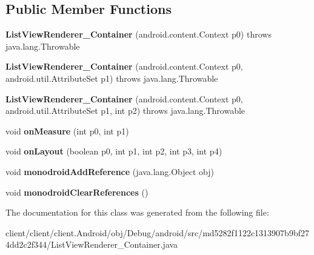 \subsection*{Public Member Functions}
\begin{DoxyCompactItemize}
\item 
\hypertarget{classmd5282f1122c1313907b9bf274dd2c2f344_1_1ListViewRenderer__Container_aec5487f4ed0e18a1cf69a340f616e8d2}{}{\bfseries List\+View\+Renderer\+\_\+\+Container} (android.\+content.\+Context p0)  throws java.\+lang.\+Throwable 	\label{classmd5282f1122c1313907b9bf274dd2c2f344_1_1ListViewRenderer__Container_aec5487f4ed0e18a1cf69a340f616e8d2}

\item 
\hypertarget{classmd5282f1122c1313907b9bf274dd2c2f344_1_1ListViewRenderer__Container_ac7349cc293b89991c55dec76ba9fb3fb}{}{\bfseries List\+View\+Renderer\+\_\+\+Container} (android.\+content.\+Context p0, android.\+util.\+Attribute\+Set p1)  throws java.\+lang.\+Throwable 	\label{classmd5282f1122c1313907b9bf274dd2c2f344_1_1ListViewRenderer__Container_ac7349cc293b89991c55dec76ba9fb3fb}

\item 
\hypertarget{classmd5282f1122c1313907b9bf274dd2c2f344_1_1ListViewRenderer__Container_a6d5abf1e4e150015c69510b2730ab722}{}{\bfseries List\+View\+Renderer\+\_\+\+Container} (android.\+content.\+Context p0, android.\+util.\+Attribute\+Set p1, int p2)  throws java.\+lang.\+Throwable 	\label{classmd5282f1122c1313907b9bf274dd2c2f344_1_1ListViewRenderer__Container_a6d5abf1e4e150015c69510b2730ab722}

\item 
\hypertarget{classmd5282f1122c1313907b9bf274dd2c2f344_1_1ListViewRenderer__Container_a419475e7d7c0dc39dc4751af4a23675f}{}void {\bfseries on\+Measure} (int p0, int p1)\label{classmd5282f1122c1313907b9bf274dd2c2f344_1_1ListViewRenderer__Container_a419475e7d7c0dc39dc4751af4a23675f}

\item 
\hypertarget{classmd5282f1122c1313907b9bf274dd2c2f344_1_1ListViewRenderer__Container_a998147f65042fe35b4000b088470e891}{}void {\bfseries on\+Layout} (boolean p0, int p1, int p2, int p3, int p4)\label{classmd5282f1122c1313907b9bf274dd2c2f344_1_1ListViewRenderer__Container_a998147f65042fe35b4000b088470e891}

\item 
\hypertarget{classmd5282f1122c1313907b9bf274dd2c2f344_1_1ListViewRenderer__Container_acc9b84023f77342d5793e8c58da8f562}{}void {\bfseries monodroid\+Add\+Reference} (java.\+lang.\+Object obj)\label{classmd5282f1122c1313907b9bf274dd2c2f344_1_1ListViewRenderer__Container_acc9b84023f77342d5793e8c58da8f562}

\item 
\hypertarget{classmd5282f1122c1313907b9bf274dd2c2f344_1_1ListViewRenderer__Container_ae792e12234669514460b48737b5153db}{}void {\bfseries monodroid\+Clear\+References} ()\label{classmd5282f1122c1313907b9bf274dd2c2f344_1_1ListViewRenderer__Container_ae792e12234669514460b48737b5153db}

\end{DoxyCompactItemize}


The documentation for this class was generated from the following file\+:\begin{DoxyCompactItemize}
\item 
client/client/client.\+Android/obj/\+Debug/android/src/md5282f1122c1313907b9bf274dd2c2f344/List\+View\+Renderer\+\_\+\+Container.\+java\end{DoxyCompactItemize}
